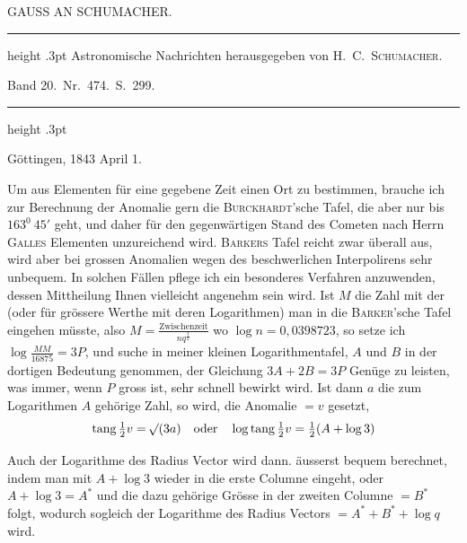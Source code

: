 \clearpage
\thispagestyle{empty}
%
\vspace*{2\baselineskip}
\begin{center}\large GAUSS AN SCHUMACHER.\end{center}
\begin{center}
\parbox{.75\linewidth}{%
  \centering\fontsize{8.2}{10.2}\selectfont
  \hrule height .3pt\relax\vspace{2.5pt}
  Astronomische Nachrichten herausgegeben von H.\ C.\ \textsc{Schumacher}.\par
  Band 20.\ Nr.\ 474.\ S.\ 299.\par
  \vspace{2.5pt}\hrule height .3pt\relax
}
\end{center}
\begin{flushright}Göttingen, 1843 April 1.\end{flushright}
\par\indent Um aus Elementen für eine gegebene Zeit einen Ort zu bestimmen, brauche ich zur Berechnung der Anomalie gern die \textsc{Burckhardt}'sche Tafel, die aber nur bis $163^0\ 45'$ geht, und daher für den gegenwärtigen Stand des Cometen nach Herrn \textsc{Galles} Elementen unzureichend wird. \textsc{Barkers} Tafel reicht zwar überall aus, wird aber bei grossen Anomalien wegen des beschwerlichen Interpolirens sehr unbequem. In solchen Fällen pflege ich ein besonderes Verfahren anzuwenden, dessen Mittheilung Ihnen vielleicht angenehm sein wird. Ist $M$ die Zahl mit der (oder für grössere Werthe mit deren Logarithmen) man in die \textsc{Barker}'sche Tafel eingehen müsste, also $M=\frac{\text{Zwischenzeit}}{nq^{\frac32}}$ wo $\log n=0{,}0398723$, so setze ich $\log\frac{MM}{16875}=3P$, und suche in meiner kleinen Logarithmentafel, $A$ und $B$ in der dortigen Bedeutung genommen, der Gleichung $3A+2B=3P$ Genüge zu leisten, was immer, wenn $P$ gross ist, sehr schnell bewirkt wird. Ist dann $a$ die zum Logarithmen $A$ gehörige Zahl, so wird, die Anomalie $=v$ gesetzt,
\[
\operatorname{tang}\tfrac12v=\mathord{{}^{}\!\surd}(3a)\quad\text{oder}\quad
\log\operatorname{tang}\tfrac12v=\tfrac12(A+\log3)
\]

Auch der Logarithme des Radius Vector wird dann. äusserst bequem berechnet, indem man mit $A+\log3$ wieder in die erste Columne eingeht, oder $A+\log3=A^*$ und die dazu gehörige Grösse in der zweiten Columne $=B^*$ folgt, wodurch sogleich der Logarithme des Radius Vectors $=A^*+B^*+\log q$ wird.

